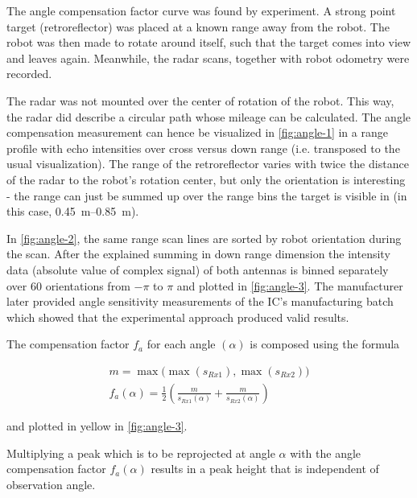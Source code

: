 The angle compensation factor curve was found by experiment. A strong
point target (retroreflector) was placed at a known range away from
the robot. The robot was then made to rotate around itself, such that
the target comes into view and leaves again. Meanwhile, the radar scans,
together with robot odometry were recorded.

The radar was not mounted over the center of rotation of the robot. This
way, the radar did describe a circular path whose mileage can be
calculated. The angle compensation measurement can hence be visualized
in \cref{fig:angle-1} in a range profile with echo intensities over
cross versus down range (i.e. transposed to the usual visualization).
The range of the retroreflector varies with
twice the distance of the radar to the robot's rotation center, but only
the orientation is interesting - the range can just be summed up over
the range bins the target is visible in (in this case,
\SIrange{0.45}{0.85}{m}).

In \cref{fig:angle-2}, the same range scan lines are sorted by robot
orientation during the scan. After the explained summing in down range
dimension the intensity data (absolute value of complex signal) of both
antennas is binned separately over 60 orientations from \(-\pi\) to
\(\pi\) and plotted in \cref{fig:angle-3}. The manufacturer later provided
angle sensitivity measurements of the
IC's manufacturing batch which showed that the
experimental approach produced valid results.

The compensation factor \(f_a\) for each angle $(\alpha)$ is composed using
the formula

\begin{align}
    m = \max \bigl( \max (s_{Rx1}), \max (s_{Rx2}) \bigr) \nonumber
    \\
    f_a(\alpha) = \frac{1}{2}
        \left(
            \frac{m}{ s_{Rx1}(\alpha) } +
            \frac{m}{ s_{Rx2}(\alpha) }
        \right)
\end{align}

and plotted in yellow in \cref{fig:angle-3}.

Multiplying a peak which is to be reprojected at angle \(\alpha\)
with the angle compensation factor \(f_a(\alpha)\) results in a peak height
that is independent of observation angle.

